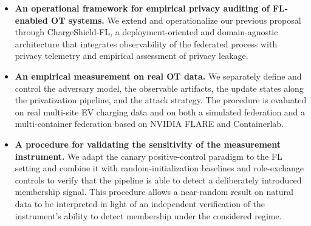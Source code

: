 \begin{itemize}

\item \textbf{An operational framework for empirical privacy auditing of FL-enabled OT systems.}
We extend and operationalize our previous proposal through ChargeShield-FL, a deployment-oriented and domain-agnostic architecture that integrates observability of the federated process with privacy telemetry and empirical assessment of privacy leakage.

\item \textbf{An empirical measurement on real OT data.}
We separately define and control the adversary model, the observable artifacts, the update states along the privatization pipeline, and the attack strategy. The procedure is evaluated on real multi-site EV charging data and on both a simulated federation and a multi-container federation based on NVIDIA FLARE and Containerlab.

\item \textbf{A procedure for validating the sensitivity of the measurement instrument.}
We adapt the canary positive-control paradigm to the FL setting and combine it with random-initialization baselines and role-exchange controls to verify that the pipeline is able to detect a deliberately introduced membership signal. This procedure allows a near-random result on natural data to be interpreted in light of an independent verification of the instrument's ability to detect membership under the considered regime.

\end{itemize}
